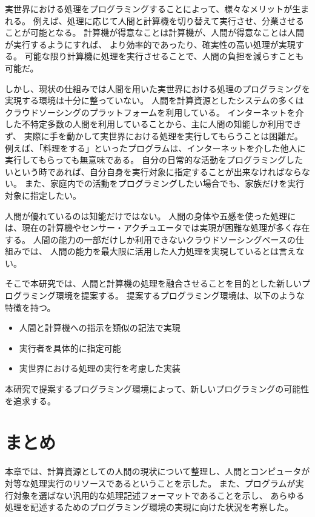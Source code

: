 実世界における処理をプログラミングすることによって、様々なメリットが生まれる。
例えば、処理に応じて人間と計算機を切り替えて実行させ、分業させることが可能となる。
計算機が得意なことは計算機が、人間が得意なことは人間が実行するようにすれば、
より効率的であったり、確実性の高い処理が実現する。
可能な限り計算機に処理を実行させることで、人間の負担を減らすことも可能だ。

しかし、現状の仕組みでは人間を用いた実世界における処理のプログラミングを実現する環境は十分に整っていない。
人間を計算資源としたシステムの多くはクラウドソーシングのプラットフォームを利用している。
インターネットを介した不特定多数の人間を利用していることから、主に人間の知能しか利用できず、
実際に手を動かして実世界における処理を実行してもらうことは困難だ。
例えば、「料理をする」といったプログラムは、インターネットを介した他人に実行してもらっても無意味である。
自分の日常的な活動をプログラミングしたいという時であれば、自分自身を実行対象に指定することが出来なければならない。
また、家庭内での活動をプログラミングしたい場合でも、家族だけを実行対象に指定したい。

人間が優れているのは知能だけではない。
人間の身体や五感を使った処理には、現在の計算機やセンサー・アクチュエータでは実現が困難な処理が多く存在する。
人間の能力の一部だけしか利用できないクラウドソーシングベースの仕組みでは、
人間の能力を最大限に活用した人力処理を実現しているとは言えない。

そこで本研究では、人間と計算機の処理を融合させることを目的とした新しいプログラミング環境を提案する。
提案するプログラミング環境は、以下のような特徴を持つ。

\begin{itemize}
\itemsep1pt\parskip0pt
\item
  人間と計算機への指示を類似の記法で実現
\item
  実行者を具体的に指定可能
\item
  実世界における処理の実行を考慮した実装
\end{itemize}

本研究で提案するプログラミング環境によって、新しいプログラミングの可能性を追求する。

\section{まとめ}\label{ux307eux3068ux3081}

本章では、計算資源としての人間の現状について整理し、人間とコンピュータが対等な処理実行のリソースであるということを示した。
また、プログラムが実行対象を選ばない汎用的な処理記述フォーマットであることを示し、
あらゆる処理を記述するためのプログラミング環境の実現に向けた状況を考察した。
